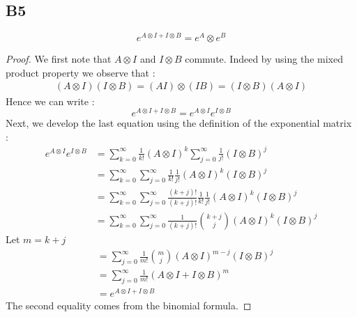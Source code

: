 \documentclass[11pt]{article}
\newcommand{\kp}{\otimes} %
\begin{document}
\subsection*{B5}
\begin{equation*}
    e^{A\kp I+I\kp B}=e^A\kp e^B
\end{equation*}
\begin{proof}
We first note that $A\kp I$ and $I\kp B$ commute. Indeed by using the mixed product property we observe that :
\begin{align*}
    (A\kp I)(I\kp B)=(AI)\kp(IB)=(I\kp B)(A\kp I)
\end{align*}
Hence we can write :
\begin{equation*}
    e^{A\kp I+I\kp B}=e^{A\kp I}e^{I\kp B}
\end{equation*}
Next, we develop the last equation using the definition of the exponential matrix :
\begin{align*}
    e^{A\kp I}e^{I\kp B}&=\sum_{k=0}^{\infty}\frac{1}{k!}(A\kp I)^k \sum_{j=0}^{\infty}\frac{1}{j!}(I\kp B)^j\\
    &=\sum_{k=0}^{\infty}\sum_{j=0}^{\infty}\frac{1}{k!}\frac{1}{j!}(A\kp I)^k (I\kp B)^j\\
    &=\sum_{k=0}^{\infty}\sum_{j=0}^{\infty}\frac{(k+j)!}{(k+j)!}\frac{1}{k!}\frac{1}{j!}(A\kp I)^k (I\kp B)^j\\
    &=\sum_{k=0}^{\infty}\sum_{j=0}^{\infty}\frac{1}{(k+j)!}{k+j\choose j}(A\kp I)^k (I\kp B)^j
\end{align*}
Let $m=k+j$
\begin{align*}
    &=\sum_{j=0}^{\infty}\frac{1}{m!}{m\choose j}(A\kp I)^{m-j} (I\kp B)^j\\
    &=\sum_{j=0}^{\infty}\frac{1}{m!}(A\kp I+I\kp B)^m\\
    &=e^{A\kp I+I\kp B}
\end{align*}
The second equality comes from the binomial formula. 
\end{proof}
\end{document}
